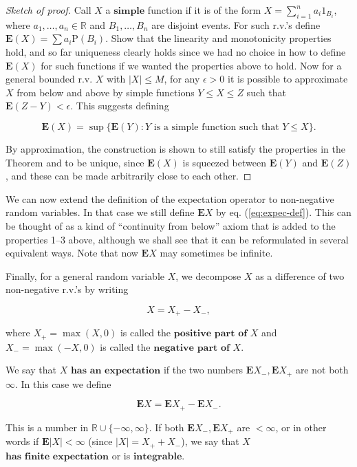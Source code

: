 \documentclass[11pt]{report}
\newcommand{\R}{\mathbb{R}}
\theoremstyle{plain}
\theoremstyle{definition}
\begin{document}
\begin{proof}[Sketch of proof]
Call $X$ a $\textbf{simple}$ function if it is of the
form $X=\sum_{i=1}^n a_i 1_{B_i}$, where
$a_1,\ldots,a_n\in \R$ and $B_1,\ldots,B_n$ are
disjoint events. For such r.v.'s define
$\mathbf{E}(X)=\sum a_i \mathrm{P}(B_i)$. Show that
the linearity and monotonicity properties hold, and so
far uniqueness clearly holds since we had no choice in
how to define $\mathbf{E}(X)$ for such functions if
we wanted the properties above to hold. Now for a
general bounded r.v. $X$ with $|X|\le M$, for any
$\epsilon>0$ it is possible to approximate $X$ from
below and above by simple functions $Y \le X \le Z$
such that $\mathbf{E}(Z-Y) < \epsilon$. This suggests
defining

\begin{equation*} \tag{15}\label{eq:expec-def}
\mathbf{E}(X) = \sup \{ \mathbf{E}(Y) : Y\textrm{ is a simple function such that }Y \le X \}.
\end{equation*}

By approximation, the construction is shown to still
satisfy the properties in the Theorem and to be
unique, since $\mathbf{E}(X)$ is squeezed between
$\mathbf{E}(Y)$ and $\mathbf{E}(Z)$, and these can be
made arbitrarily close to each other.
\end{proof}

We can now extend the definition of the expectation
operator to non-negative random variables. In that
case we still define $\mathbf{E} X$ by eq.
(\ref{eq:expec-def}). This can be thought of as a kind of
``continuity from below'' axiom that is added to the
properties 1--3 above, although we shall see that it
can be reformulated in several equivalent ways. Note
that now $\mathbf{E} X$ may sometimes be infinite.

Finally, for a general random variable $X$, we
decompose $X$ as a difference of two non-negative
r.v.'s by writing

\[
X = X_+ - X_-,
\]

where $X_+ = \max(X,0)$ is called the
$\textbf{positive part of } X$ and $X_-=\max(-X,0)$
is called the $\textbf{negative part of } X$.

We say that $X$ $\textbf{has an expectation}$ if the
two numbers $\mathbf{E} X_-, \mathbf{E} X_+$ are not
both $\infty$. In this case we define

\[
\mathbf{E} X = \mathbf{E} X_+ - \mathbf{E} X_-.
\]

This is a number in $\R\cup\{ -\infty,\infty\}$. If
both $\mathbf{E} X_-, \mathbf{E} X_+$ are $<\infty$,
or in other words if $\mathbf{E} |X|<\infty$ (since
$|X|=X_+ + X_-$), we say that $X$
$\textbf{has finite expectation}$ or is
$\textbf{integrable}$.
\end{document}
